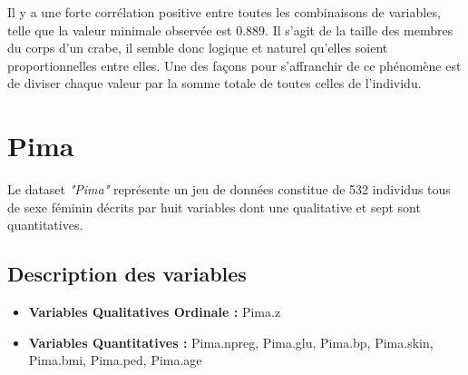 \documentclass[10pt]{article}
\begin{document}
Il y a une forte corrélation positive entre toutes les combinaisons de variables, telle que la valeur minimale observée est 0.889. 
Il s'agit de la taille des membres du corps d'un crabe, il semble donc logique et naturel qu'elles soient proportionnelles entre elles.
Une des façons pour s'affranchir de ce phénomène est de diviser chaque valeur par la somme totale de toutes celles de l'individu.


\section{Pima}
Le dataset \textit{"Pima"} représente un jeu de données constitue de 532 individus tous de sexe féminin décrits par huit variables dont une qualitative et sept sont quantitatives.

\subsection{Description des variables}


\begin{itemize}
	\item \textbf{Variables Qualitatives Ordinale :}  Pima.z
	\item \textbf{Variables Quantitatives : } Pima.npreg, Pima.glu, Pima.bp, Pima.skin, Pima.bmi, Pima.ped, Pima.age
\end{itemize}
\end{document}
